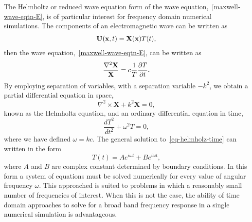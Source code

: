 The Helmholtz or reduced wave equation form of the wave equation,~\eqref{maxwell-wave-eqtn-E}, is of particular interest for frequency domain numerical simulations. The components of an electromagnetic wave can be written as
$$
\mathbf{U}(\mathbf{x},t) = \mathbf{X}(\mathbf{x}) T(t),
$$
then the wave equation,~\eqref{maxwell-wave-eqtn-E}, can be written as
\begin{equation}
\label{eq:helmholz-space}
\frac{\nabla^2 \mathbf{X}}{\mathbf{X}} = c \frac{1}{T} \frac{\partial T}{\partial t} .
\end{equation}
By employing separation of variables, with a separation variable $-k^2$, we obtain a partial differential equation in space,
\begin{equation}
\nabla^2 \times \mathbf{X} + k^2 \mathbf{X} = 0 ,
\label{eq-helmholz-time}
\end{equation}
known as the Helmholtz equation, and an ordinary differential equation in time,
\begin{equation}
\frac{d T ^2}{d t ^2} + \omega ^2 T  = 0 ,
\label{eq-helmholz-time}
\end{equation}
where we have defined $\omega = k c$. The general solution to~\eqref{eq-helmholz-time} can written in the form
\begin{equation}
\label{eq:helmholtz-time-soltn}
T(t) = A e^{i \omega t} + B e^{i \omega t},
\end{equation}
where $A$ and $B$ are complex constant determined by boundary conditions. In this form a system of equations must be solved numerically for every value of angular frequency $\omega$. This approached is suited to problems in which a reasonably small number of frequencies of interest. When this is not the case, the ability of time domain approaches to solve for a broad band frequency response in a single numerical simulation is advantageous.


